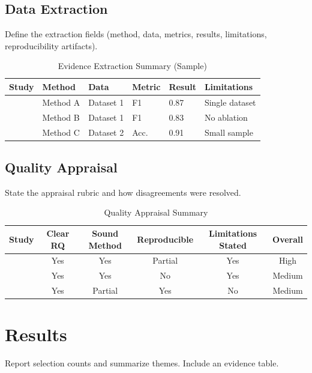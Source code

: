 \documentclass[11pt]{article}
\begin{document}
\subsection{Data Extraction}
Define the extraction fields (method, data, metrics, results, limitations, reproducibility artifacts).

\begin{table}[ht]
  \centering
  \caption{Evidence Extraction Summary (Sample)}
  \label{tab:extraction}
  \begin{tabular}{llllll}
    \toprule
    Study & Method & Data & Metric & Result & Limitations \\
    \midrule
    \citet{smith2023} & Method A & Dataset 1 & F1 & 0.87 & Single dataset \\
    \citet{jones2022} & Method B & Dataset 1 & F1 & 0.83 & No ablation \\
    \citet{other2021} & Method C & Dataset 2 & Acc. & 0.91 & Small sample \\
    \bottomrule
  \end{tabular}
\end{table}

\subsection{Quality Appraisal}
State the appraisal rubric and how disagreements were resolved.

\begin{table}[ht]
  \centering
  \caption{Quality Appraisal Summary}
  \label{tab:quality}
  \begin{tabular}{lccccc}
    \toprule
    Study & Clear RQ & Sound Method & Reproducible & Limitations Stated & Overall \\
    \midrule
    \citet{smith2023} & Yes & Yes & Partial & Yes & High \\
    \citet{jones2022} & Yes & Yes & No      & Yes & Medium \\
    \citet{other2021} & Yes & Partial & Yes  & No  & Medium \\
    \bottomrule
  \end{tabular}
\end{table}

\section{Results}
Report selection counts and summarize themes. Include an evidence table.
\end{document}
